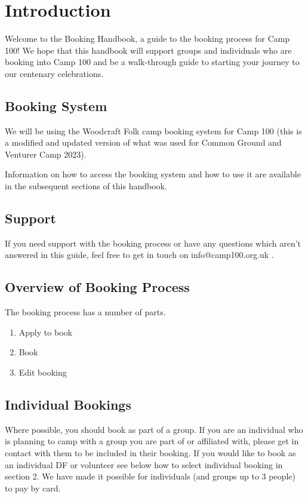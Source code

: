 \documentclass[a4paper, 11pt]{report}
\begin{document}
\makedocumenttitlepage

\tableofcontents

\chapter{Introduction}
Welcome to the Booking Handbook, a guide to the booking process for Camp 100! We hope that this handbook will support groups and individuals who are booking into Camp 100 and be a walk-through guide to starting your journey to our centenary celebrations. 

\section{Booking System}
We will be using the Woodcraft Folk camp booking system for Camp 100 (this is a modified and updated version of what was used for Common Ground and Venturer Camp 2023). 

Information on how to access the booking system and how to use it are available in the subsequent sections of this handbook.

\section{Support}
If you need support with the booking process or have any questions which aren't answered in this guide, feel free to get in touch on info@camp100.org.uk .

\section{Overview of Booking Process}
The booking process has a number of parts.
\begin{enumerate}
    \item Apply to book 
    \item Book 
    \item Edit booking 
\end{enumerate}

\section{Individual Bookings}
Where possible, you should book as part of a group. If you are an individual who is planning to camp with a group you are part of or affiliated with, please get in contact with them to be included in their booking. If you would like to book as an individual DF or volunteer see below how to select individual booking in section 2. We have made it possible for individuals (and groups up to 3 people) to pay by card. 
\end{document}
